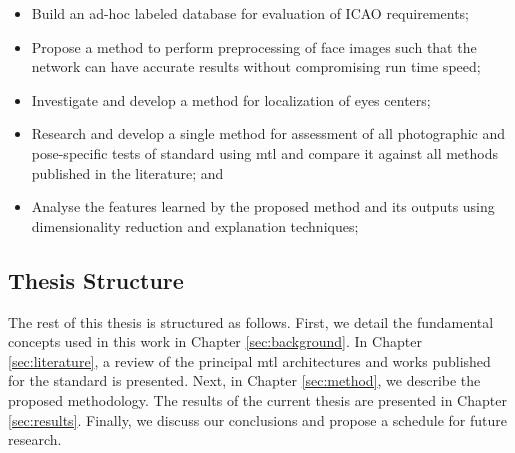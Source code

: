\begin{itemize}
\item Build an ad-hoc labeled database for evaluation of ICAO requirements;
\item Propose a method to perform preprocessing of face images such that the network can have accurate results without compromising run time speed;
\item Investigate and develop a method for localization of eyes centers;
\item Research and develop a single method for assessment of all photographic and pose-specific tests of \icao standard using \acf{mtl} and compare it against all methods published in the literature; and
\item Analyse the features learned by the proposed method and its outputs using dimensionality reduction and explanation techniques;
\end{itemize}
 
\subsection{Thesis Structure}
 
The rest of this thesis is structured as follows. First, we detail the fundamental concepts used in this work in Chapter \ref{sec:background}. In Chapter \ref{sec:literature}, a review of the principal \acl{mtl} architectures and works published for the \icao standard is presented. Next, in Chapter \ref{sec:method}, we describe the proposed methodology. The results of the current thesis are presented in Chapter \ref{sec:results}. Finally, we discuss our conclusions and propose a schedule for future research.
 